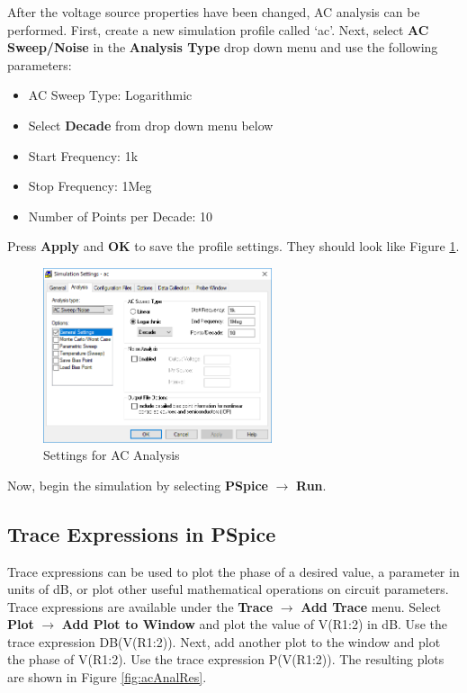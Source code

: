 \documentclass[12pt]{../manual}
\begin{document}
After the voltage source properties have been changed, AC analysis can be performed. First, create a new simulation profile called `ac'. Next, select \textbf{AC Sweep/Noise} in the \textbf{Analysis Type} drop down menu and use the following parameters:
\begin{itemize}
\item AC Sweep Type: Logarithmic 
\item Select \textbf{Decade} from drop down menu below
\item Start Frequency: 1k
\item Stop Frequency: 1Meg
\item Number of Points per Decade: 10
\end{itemize}
Press \textbf{Apply} and \textbf{OK} to save the profile settings. They should look like Figure \ref{fig:acSettings}.

\begin{figure}[ht!]
	\begin{center}
		\includegraphics[width=0.6\textwidth]{figures/ACAnalysisSettings.PNG}
	\end{center}
	\caption{Settings for AC Analysis}
	\label{fig:acSettings}
\end{figure}

Now, begin the simulation by selecting \textbf{PSpice} $\to$ \textbf{Run}. %

\subsection*{Trace Expressions in PSpice}
Trace expressions can be used to plot the phase of a desired value, a parameter in units of dB, or plot other useful mathematical operations on circuit parameters. Trace expressions are available under the \textbf{Trace} $\to$ \textbf{Add Trace} menu. Select \textbf{Plot} $\to$ \textbf{Add Plot to Window} and plot the value of V(R1:2) in dB. Use the trace expression DB(V(R1:2)). Next, add another plot to the window and plot the phase of V(R1:2). Use the trace expression P(V(R1:2)). The resulting plots are shown in Figure \ref{fig:acAnalRes}.
\end{document}
